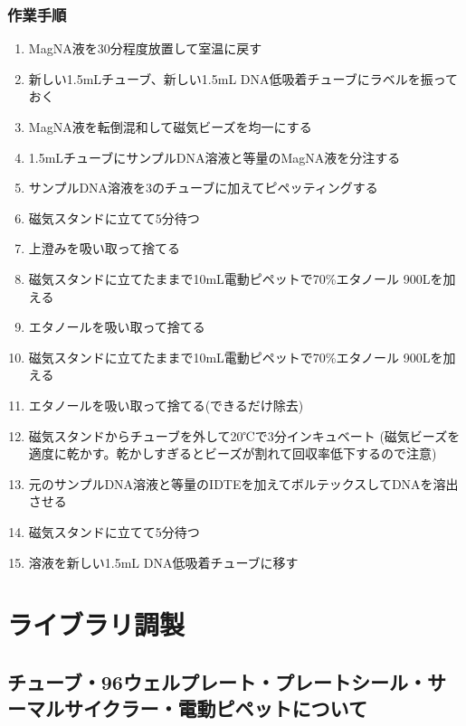 \documentclass[titlepage,10pt,a4paper]{jsbook}
\begin{document}
\subsubsection{作業手順}
\begin{enumerate}
\item MagNA液を30分程度放置して室温に戻す
\item 新しい1.5mLチューブ、新しい1.5mL DNA低吸着チューブにラベルを振っておく
\item MagNA液を転倒混和して磁気ビーズを均一にする
\item 1.5mLチューブにサンプルDNA溶液と等量のMagNA液を分注する
\item サンプルDNA溶液を3のチューブに加えてピペッティングする
\item 磁気スタンドに立てて5分待つ
\item 上澄みを吸い取って捨てる
\item 磁気スタンドに立てたままで10mL電動ピペットで70\%エタノール 900{\textmu}Lを加える
\item エタノールを吸い取って捨てる
\item 磁気スタンドに立てたままで10mL電動ピペットで70\%エタノール 900{\textmu}Lを加える
\item エタノールを吸い取って捨てる(できるだけ除去)
\item 磁気スタンドからチューブを外して20℃で3分インキュベート (磁気ビーズを適度に乾かす。乾かしすぎるとビーズが割れて回収率低下するので注意)
\item 元のサンプルDNA溶液と等量のIDTEを加えてボルテックスしてDNAを溶出させる
\item 磁気スタンドに立てて5分待つ
\item 溶液を新しい1.5mL DNA低吸着チューブに移す
\end{enumerate}

\section{ライブラリ調製}

\subsection{チューブ・96ウェルプレート・プレートシール・サーマルサイクラー・電動ピペットについて}
\end{document}

